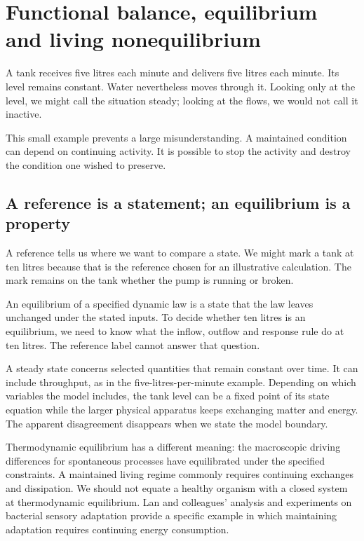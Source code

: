 \chapter{Functional balance, equilibrium and living nonequilibrium}\label{ch:balance}

A tank receives five litres each minute and delivers five litres each minute. Its level remains constant. Water nevertheless moves through it. Looking only at the level, we might call the situation steady; looking at the flows, we would not call it inactive.

This small example prevents a large misunderstanding. A maintained condition can depend on continuing activity. It is possible to stop the activity and destroy the condition one wished to preserve.

\section{A reference is a statement; an equilibrium is a property}
A reference tells us where we want to compare a state. We might mark a tank at ten litres because that is the reference chosen for an illustrative calculation. The mark remains on the tank whether the pump is running or broken.

An equilibrium of a specified dynamic law is a state that the law leaves unchanged under the stated inputs. To decide whether ten litres is an equilibrium, we need to know what the inflow, outflow and response rule do at ten litres. The reference label cannot answer that question.

A steady state concerns selected quantities that remain constant over time. It can include throughput, as in the five-litres-per-minute example. Depending on which variables the model includes, the tank level can be a fixed point of its state equation while the larger physical apparatus keeps exchanging matter and energy. The apparent disagreement disappears when we state the model boundary.

Thermodynamic equilibrium has a different meaning: the macroscopic driving differences for spontaneous processes have equilibrated under the specified constraints. A maintained living regime commonly requires continuing exchanges and dissipation. We should not equate a healthy organism with a closed system at thermodynamic equilibrium. Lan and colleagues' analysis and experiments on bacterial sensory adaptation provide a specific example in which maintaining adaptation requires continuing energy consumption.\cite{adaptation}

